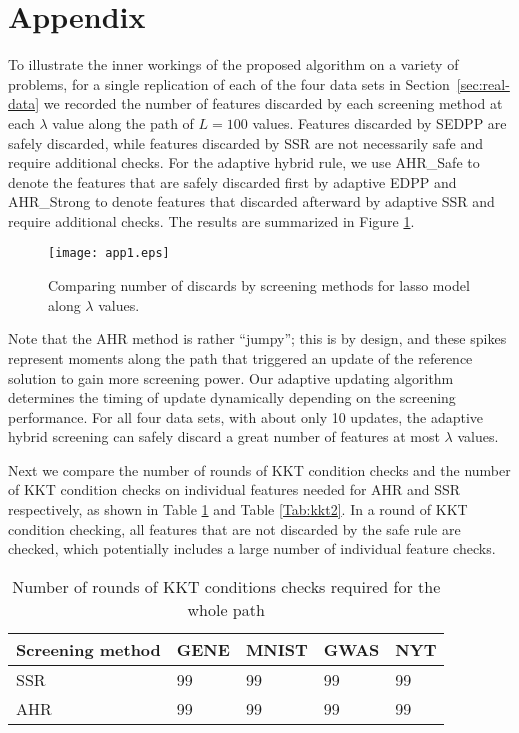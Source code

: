 
\section*{Appendix}

To illustrate the inner workings of the proposed algorithm on a variety of problems, for a single replication of each of the four data sets in Section~\ref{sec:real-data} we recorded the number of features discarded by each screening method at each $\lambda$ value along the path of $L=100$ values. Features discarded by SEDPP are safely discarded, while features discarded by SSR are not necessarily safe and require additional checks. For the adaptive hybrid rule, we use AHR\_Safe to denote the features that are safely discarded first by adaptive EDPP and AHR\_Strong to denote features that discarded afterward by adaptive SSR and require additional checks. The results are summarized in Figure \ref{fig:ap1}.

\begin{figure}[H]
    \centering
    \texttt{[image: app1.eps]}    \caption{Comparing number of discards by screening methods for lasso model along $\lambda$ values.}
    \label{fig:ap1}
\end{figure}

Note that the AHR method is rather ``jumpy''; this is by design, and these spikes represent moments along the path that triggered an update of the reference solution to gain more screening power. Our adaptive updating algorithm determines the timing of update dynamically depending on the screening performance. For all four data sets, with about only 10 updates, the adaptive hybrid screening can safely discard a great number of features at most $\lambda$ values.

Next we compare the number of rounds of KKT condition checks and the number of KKT condition checks on individual features needed for AHR and SSR respectively, as shown in Table \ref{Tab:kkt1} and Table \ref{Tab:kkt2}. In a round of KKT condition checking, all features that are not discarded by the safe rule are checked, which potentially includes a large number of individual feature checks.

\begin{table}[H]
\centering
\begin{tabular}{lllll}
\toprule
Screening method & GENE & MNIST & GWAS & NYT \\
\midrule
SSR & 99 & 99 & 99 & 99 \\
AHR & 99 & 99 & 99 & 99 \\
\bottomrule
\end{tabular}
\caption{Number of rounds of KKT conditions checks required for the whole path}
\label{Tab:kkt1}
\end{table}

